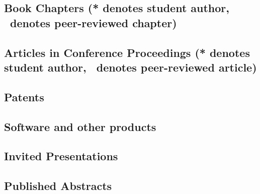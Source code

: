 \documentclass[10pt]{article}
\begin{document}
    \subsection[Book Chapters]{Book Chapters (* denotes student author, \textdagger\ denotes peer-reviewed chapter)}
    \begin{refsection}
        \nocite{*}
        \printbibliography[heading=none,type=incollection]
    \end{refsection}
    \subsection[Articles in Conference Proceedings]{Articles in Conference Proceedings (* denotes student author, \textdagger\ denotes peer-reviewed article)}
    \begin{refsection}
        \nocite{*}
        \printbibliography[heading=none,type=inproceedings]
    \end{refsection}
  \subsection{Patents}
    \begin{refsection}
        \nocite{*}
        \printbibliography[heading=none,type=patent]
       \end{refsection}
  \subsection{Software and other products}
      
    \subsection{Invited Presentations}
    \begin{enumerate}
    
    
    \end{enumerate}
    \subsection{Published Abstracts}
    \begin{enumerate}
    
    
    \end{enumerate}
\end{document}
